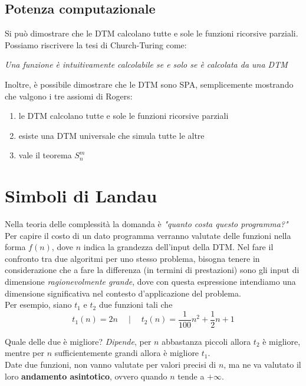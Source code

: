 \subsection{Potenza computazionale}

Si può dimostrare che le DTM calcolano tutte e sole le funzioni ricorsive parziali. Possiamo riscrivere la tesi di Church-Turing come: 
\begin{center}
	\textit{Una funzione è intuitivamente calcolabile se e solo se è calcolata da una DTM}
\end{center}

Inoltre, è possibile dimostrare che le DTM sono SPA, semplicemente mostrando che valgono i tre assiomi di Rogers: 
\begin{enumerate}
	\item le DTM calcolano tutte e sole le funzioni ricorsive parziali 
	\item esiste una DTM universale che simula tutte le altre
	\item vale il teorema $S^m_n$
\end{enumerate}

\section{Simboli di Landau}

Nella teoria delle complessità la domanda è \textit{"quanto costa questo programma?"} Per capire il costo di un dato programma verranno valutate delle funzioni nella forma $f(n)$, dove $n$ indica la grandezza dell'input della DTM. Nel fare il confronto tra due algoritmi per uno stesso problema, bisogna tenere in considerazione che a fare la differenza (in termini di prestazioni) sono gli input di dimensione \textit{ragionevolmente grande}, dove con questa espressione intendiamo una dimensione significativa nel contesto d'applicazione del problema.\\

Per esempio, siano $t_1$ e $t_2$ due funzioni tali che
$$ t_1 (n) = 2n \quad \mid \quad t_2 (n) = \frac{1}{100} n^2 + \frac{1}{2}n + 1 $$

Quale delle due è migliore? \textit{Dipende}, per $n$ abbastanza piccoli allora $t_2$ è migliore, mentre per $n$ sufficientemente grandi allora è migliore $t_1$.\\

Date due funzioni, non vanno valutate per valori precisi di $n$, ma ne va valutato il loro \textbf{andamento asintotico}, ovvero quando $n$ tende a $+ \infty$.\\

